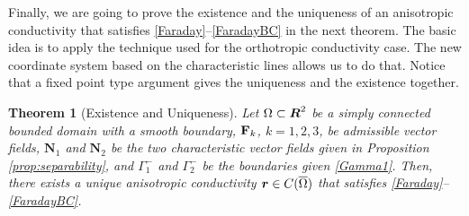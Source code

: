 \documentclass[11pt]{amsart}
\theoremstyle{plain}
\newtheorem{Thm}{Theorem}
\numberwithin{equation}{section}
\numberwithin{Thm}{section}
\def\R{\mbox{\boldmath$R$}}
\def\N{{\mathbf N}}
\def\F{{\bf F}}
\def\r{{\bf r}}
\def\r{\mbox{\boldmath$r$}}
\begin{document}
Finally, we are going to prove the existence and the uniqueness of an anisotropic conductivity that satisfies \eqref{Faraday}--\eqref{FaradayBC} in the next theorem. The basic idea is to apply the technique used for the orthotropic conductivity case. The new coordinate system based on the characteristic lines allows us to do that. Notice that a fixed point type argument gives the uniqueness and the existence together.

\begin{Thm}[Existence and Uniqueness] \label{thm:main}
Let $\Omega\subset\R^2$  be a simply connected bounded domain with a smooth boundary, $\F_k$, $k=1,2,3$, be admissible vector fields, $\N_1$ and $\N_2$ be the two characteristic vector fields given in Proposition \ref{prop:separability}, and $\Gamma^-_1$ and $\Gamma^-_2$ be the boundaries given \eqref{Gamma1}. Then, there exists a unique anisotropic conductivity $\r\in C(\overline\Omega)$ that satisfies \eqref{Faraday}--\eqref{FaradayBC}.
\end{Thm}
\end{document}

